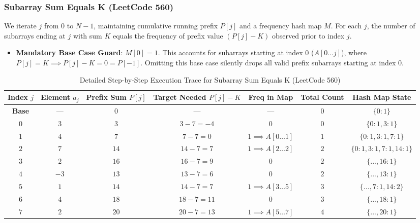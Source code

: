 \documentclass[10pt,journal,compsoc,onecolumn]{IEEEtran}
\begin{document}
\subsubsection{Subarray Sum Equals K (LeetCode 560)}
We iterate $j$ from $0$ to $N-1$, maintaining cumulative running prefix $P[j]$ and a frequency hash map $M$. For each $j$, the number of subarrays ending at $j$ with sum $K$ equals the frequency of prefix value $(P[j] - K)$ observed prior to index $j$.
\begin{itemize}
    \item \textbf{Mandatory Base Case Guard}: $M[0] = 1$. This accounts for subarrays starting at index $0$ ($A[0 \dots j]$), where $P[j] = K \implies P[j] - K = 0 = P[-1]$. Omitting this base case silently drops all valid prefix subarrays starting at index 0.
\end{itemize}

\begin{table}[htbp]
\caption{Detailed Step-by-Step Execution Trace for Subarray Sum Equals K (LeetCode 560)}
\label{tab:trace_lc560}
\centering
\begin{tabular}{ccccccc}
\toprule
\textbf{Index $j$} & \textbf{Element $a_j$} & \textbf{Prefix Sum $P[j]$} & \textbf{Target Needed $P[j] - K$} & \textbf{Freq in Map} & \textbf{Total Count} & \textbf{Hash Map State} \\
\midrule
\textbf{Base} & --- & $0$ & --- & --- & $0$ & $\{0: 1\}$ \\
$0$ & $3$ & $3$ & $3 - 7 = -4$ & $0$ & $0$ & $\{0: 1, 3: 1\}$ \\
$1$ & $4$ & $7$ & $7 - 7 = 0$ & $1 \implies A[0 \dots 1]$ & $1$ & $\{0: 1, 3: 1, 7: 1\}$ \\
$2$ & $7$ & $14$ & $14 - 7 = 7$ & $1 \implies A[2 \dots 2]$ & $2$ & $\{0: 1, 3: 1, 7: 1, 14: 1\}$ \\
$3$ & $2$ & $16$ & $16 - 7 = 9$ & $0$ & $2$ & $\{..., 16: 1\}$ \\
$4$ & $-3$ & $13$ & $13 - 7 = 6$ & $0$ & $2$ & $\{..., 13: 1\}$ \\
$5$ & $1$ & $14$ & $14 - 7 = 7$ & $1 \implies A[3 \dots 5]$ & $3$ & $\{..., 7: 1, 14: 2\}$ \\
$6$ & $4$ & $18$ & $18 - 7 = 11$ & $0$ & $3$ & $\{..., 18: 1\}$ \\
$7$ & $2$ & $20$ & $20 - 7 = 13$ & $1 \implies A[5 \dots 7]$ & $4$ & $\{..., 20: 1\}$ \\
\bottomrule
\end{tabular}
\end{table}
\end{document}
